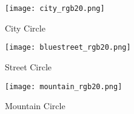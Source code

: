 \documentclass[12pt,a4paper]{article}
\begin{document}
\begin{figure}[htbp]
	\centering
	\begin{minipage}[t]{0.32\linewidth}
		\centering
		\texttt{[image: city\_rgb20.png]}
		\caption{City Circle}
	\end{minipage}
	\begin{minipage}[t]{0.32\linewidth}
		\centering
		\texttt{[image: bluestreet\_rgb20.png]}
		\caption{Street Circle}
	\end{minipage}
	\begin{minipage}[t]{0.32\linewidth}
		\centering
		\texttt{[image: mountain\_rgb20.png]}
		\caption{Mountain Circle}
	\end{minipage}                        
\end{figure}
\thispagestyle{empty}
\end{document}

